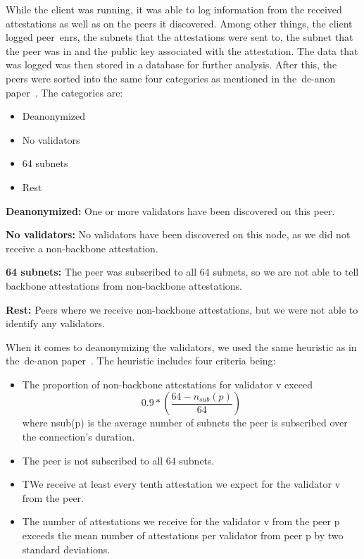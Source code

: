 While the client was running,
it was able to log information from the received attestations as well as on the peers it discovered.
Among other things, the client logged peer~\glspl{enr}, the subnets that the attestations were sent to,
the subnet that the peer was in and the public key associated with the attestation.
The data that was logged was then stored in a database for further analysis.
After this,
the peers were sorted into the same four categories
as mentioned in the~\gls{de-anon paper}~\cite{heimbach2024deanonymizingethereumvalidatorsp2p}.
The categories are:
\begin{itemize}
    \item Deanonymized
    \item No validators
    \item 64 subnets
    \item Rest
\end{itemize}

\textbf{Deanonymized:} One or more validators have been discovered on this peer.

\textbf{No validators:} No validators have been discovered on this node, as we did not receive a non-backbone attestation.

\textbf{64 subnets:} The peer was subscribed to all 64 subnets,
so we are not able to tell backbone attestations from non-backbone attestations.

\textbf{Rest:} Peers where we receive non-backbone attestations, but we were not able to identify any validators.

When it comes to deanonymizing the validators,
we used the same heuristic as in the~\gls{de-anon paper}~\cite{heimbach2024deanonymizingethereumvalidatorsp2p}.
The heuristic includes four criteria being:
\begin{itemize}
    \item The proportion of non-backbone attestations for validator v exceed
    \begin{equation}
        0.9*\left(\frac{64-n_{sub}(p)}{64}\right)
        \label{eq:heurestic}
    \end{equation} where nsub(p) is the average number of subnets the peer is subscribed over the connection’s duration.
    \item The peer is not subscribed to all 64 subnets.
    \item TWe receive at least every tenth attestation we expect for the validator v from the peer.
    \item The number of attestations we receive for the validator v from the peer p exceeds the mean number of attestations per validator from peer p by two standard deviations.
\end{itemize}